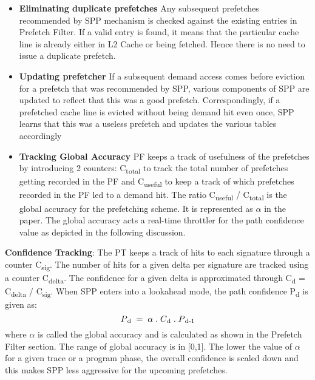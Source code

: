 \documentclass{sig-alternate}
\begin{document}
\begin{itemize}
    \item \textbf{Eliminating duplicate prefetches}\newline 
    Any subsequent prefetches recommended by SPP mechanism is checked against the existing entries in Prefetch Filter. 
If a valid entry is found, it means that the particular cache line is already either in L2 Cache or being fetched. 
Hence there is no need to issue a duplicate prefetch.
    
    \item \textbf{Updating prefetcher}\newline
    If a subsequent demand access comes before eviction for a prefetch that was recommended by SPP, various components of SPP are updated to reflect that this was a good prefetch. 
Correspondingly, if a prefetched cache line is evicted without being demand hit even once, SPP learns that this was a useless prefetch and updates the various tables accordingly
    
    \item \textbf{Tracking Global Accuracy}\newline
    PF keeps a track of usefulness of the prefetches by introducing 2 counters: C\textsubscript{total} to track the total number of prefetches getting recorded in the PF and C\textsubscript{useful} to keep a track of which prefetches recorded in the PF led to a demand hit. 
The ratio C\textsubscript{useful} / C\textsubscript{total} is the global accuracy for the prefetching scheme. 
It is represented as $\alpha$ in the paper. 
The global accuracy acts a real-time throttler for the path confidence value as depicted in the following discussion.
\newline
\end{itemize}
\textbf{Confidence Tracking}: The PT keeps a track of hits to each signature through a counter C\textsubscript{sig}. 
The number of hits for a given delta per signature are tracked using a counter C\textsubscript{delta}. 
The confidence for a given delta is approximated through C\textsubscript{d} = C\textsubscript{delta} / C\textsubscript{sig}. 
When SPP enters into a lookahead mode, the path confidence P\textsubscript{d} is given as:
$$P\textsubscript{d} \;=\; \alpha  \;.\;  C\textsubscript{d}  \;.\;  P\textsubscript{d-1}$$ where $\alpha$ is called the global accuracy and is calculated as shown in the Prefetch Filter section. 
The range of global accuracy is in [0,1]. 
The lower the value of $\alpha$ for a given trace or a program phase, the overall confidence is scaled down and this makes SPP less aggressive for the upcoming prefetches.
\end{document}
